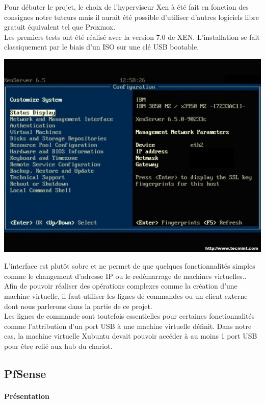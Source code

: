 \documentclass[a4paper,12pt]{extarticle}
\begin{document}
Pour débuter le projet, le choix de l’hyperviseur Xen à été fait en fonction des consignes notre tuteurs mais il aurait été possible d’utiliser d’autres logiciels libre gratuit équivalent tel que Proxmox. \\
Les premiers tests ont été réalisé avec la version 7.0 de XEN. L’installation se fait classiquement par le biais d’un ISO sur une clé USB bootable.

\begin{center}
\includegraphics[scale=0.60]{xenserver18}\\
\end{center}

L’interface est plutôt sobre et ne permet de que quelques fonctionnalités simples comme le changement d’adresse IP ou le redémarrage de machines virtuelles.. Afin de pouvoir réaliser des opérations complexes comme la création d’une machine virtuelle, il faut utiliser les lignes de commandes ou un client externe dont nous parlerons dans la partie de ce projet.\\

Les lignes de commande sont toutefois essentielles pour certaines fonctionnalités comme l’attribution d’un port USB à une machine virtuelle définit. Dans notre cas, la machine virtuelle Xubuntu devait pouvoir accéder à au moins 1 port USB pour être relié aux hub du chariot.

\subsection{PfSense}
\paragraph{Présentation\\}
\end{document}
